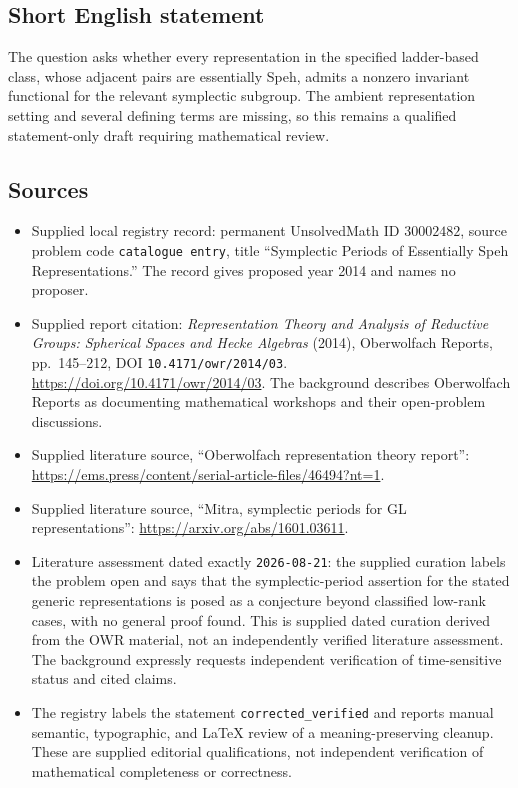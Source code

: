 \documentclass[11pt]{article}
\begin{document}
\subsection{Short English statement}
The question asks whether every representation in the specified ladder-based class, whose adjacent pairs are essentially Speh, admits a nonzero invariant functional for the relevant symplectic subgroup. The ambient representation setting and several defining terms are missing, so this remains a qualified statement-only draft requiring mathematical review.
\subsection{Sources}
\begin{itemize}
\item Supplied local registry record: permanent UnsolvedMath ID \(30002482\), source problem code \texttt{catalogue entry}, title ``Symplectic Periods of Essentially Speh Representations.'' The record gives proposed year 2014 and names no proposer.
\item Supplied report citation: \emph{Representation Theory and Analysis of Reductive Groups: Spherical Spaces and Hecke Algebras} (2014), Oberwolfach Reports, pp.\ 145--212, DOI \texttt{10.4171/owr/2014/03}. \url{https://doi.org/10.4171/owr/2014/03}. The background describes Oberwolfach Reports as documenting mathematical workshops and their open-problem discussions.
\item Supplied literature source, ``Oberwolfach representation theory report'': \url{https://ems.press/content/serial-article-files/46494?nt=1}.
\item Supplied literature source, ``Mitra, symplectic periods for GL representations'': \url{https://arxiv.org/abs/1601.03611}.
\item Literature assessment dated exactly \texttt{2026-08-21}: the supplied curation labels the problem open and says that the symplectic-period assertion for the stated generic representations is posed as a conjecture beyond classified low-rank cases, with no general proof found. This is supplied dated curation derived from the OWR material, not an independently verified literature assessment. The background expressly requests independent verification of time-sensitive status and cited claims.
\item The registry labels the statement \texttt{corrected\_verified} and reports manual semantic, typographic, and LaTeX review of a meaning-preserving cleanup. These are supplied editorial qualifications, not independent verification of mathematical completeness or correctness.
\end{itemize}
\end{document}
